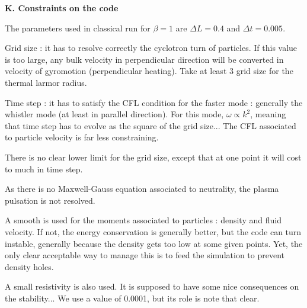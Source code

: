 \documentclass[a4paper,11pt]{letter}
\begin{document}
\newpage

{\bf K. Constraints on the code}

The parameters used in classical run for $\beta = 1$ are $\Delta L = 0.4$ and $\Delta t = 0.005$.

Grid size : it has to resolve correctly the cyclotron turn of particles. If this value is too large, any bulk velocity in perpendicular direction will be converted in velocity of gyromotion (perpendicular heating). Take at least 3 grid size for the thermal larmor radius.

Time step : it has to satisfy the CFL condition for the faster mode : generally the whistler mode (at least in parallel direction). For this mode, $\omega \propto k^2$, meaning that time step has to evolve as the square of the grid size... The CFL associated to particle velocity is far less constraining.

There is no clear lower limit for the grid size, except that at one point it will cost to much in time step.

As there is no Maxwell-Gauss equation associated to neutrality, the plasma pulsation is not resolved.

A smooth is used for the moments associated to particles : density and fluid velocity. If not, the energy conservation is generally better, but the code can turn instable, generally because the density gets too low at some given points. Yet, the only clear acceptable way to manage this is to feed the simulation to prevent density holes.

A small resistivity is also used. It is supposed to have some nice consequences on the stability... We use a value of 0.0001, but its role is note that clear.
\end{document}
